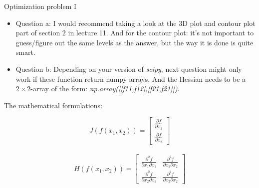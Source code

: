 \documentclass[10pt,danish,t,10pt]{beamer}
\newcommand{\code}[1]{\textit{#1}} %
\begin{document}
\begin{frame}{Optimization problem I}
    \begin{itemize}
        \item Question a: I would recommend taking a look at the 3D plot and contour plot part of section 2 in lecture 11. And for the contour plot: it's not important to guess/figure out the same levels as the answer, but the way it is done is quite smart.
        \item Question b: Depending on your version of \code{scipy}, next question might only work if these function return numpy arrays.
        And the Hessian needs to be a $2\times 2$-array of the form: \code{np.array([[f11,f12],[f21,f21]])}. 
    \end{itemize}
    
\begin{alertblock}{The mathematical formulations:}

\begin{equation*}
    J\left( f\left(x_{1},x_{2}\right) \right) = 
    \begin{bmatrix}
        \frac{\partial f}{\partial x_{1}} \\
        \frac{\partial f}{\partial x_{2}}
    \end{bmatrix}
\end{equation*}
\\
\begin{equation*}
  H\left( f\left(x_{1},x_{2}\right) \right) = 
  \begin{bmatrix}
    \frac{\partial^{2} f}{\partial x_{1} \partial x_{1} } & \frac{\partial^{2} f}{\partial x_{1} \partial x_{2} } \\
    \frac{\partial^{2} f}{\partial x_{2} \partial x_{1} } & \frac{\partial^{2} f}{\partial x_{2} \partial x_{2} }
  \end{bmatrix}
\end{equation*}   
\end{alertblock}
    

 
\end{frame}
\end{document}

